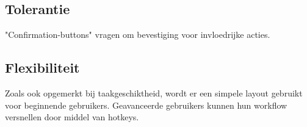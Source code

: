 \documentclass[11pt,english]{article}
\begin{document}
  \subsection{Tolerantie}
  "Confirmation-buttons" vragen om bevestiging voor invloedrijke acties.

  \subsection{Flexibiliteit}
  Zoals ook opgemerkt bij taakgeschiktheid, wordt er een simpele layout gebruikt
  voor beginnende gebruikers. Geavanceerde gebruikers kunnen hun workflow
  versnellen door middel van hotkeys.
\end{document}
